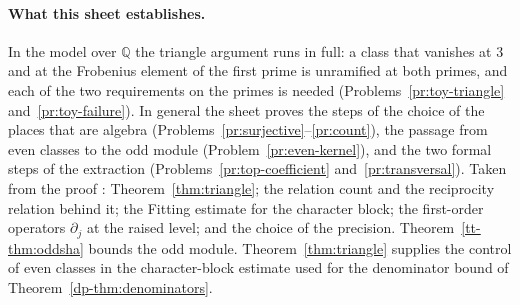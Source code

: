 \documentclass[reqno]{amsart}
\theoremstyle{definition}
\theoremstyle{plain}
\newcommand{\Q}{\mathbb{Q}}
\begin{document}
{\raggedright
\paragraph{What this sheet establishes.}  In the model over \(\Q\) the triangle argument runs in full: a class that vanishes at \(3\) and at the Frobenius element of the first prime is unramified at both primes, and each of the two requirements on the primes is needed (Problems~\ref{pr:toy-triangle} and~\ref{pr:toy-failure}).  In general the sheet proves the steps of the choice of the places that are algebra (Problems~\ref{pr:surjective}--\ref{pr:count}), the passage from even classes to the odd module (Problem~\ref{pr:even-kernel}), and the two formal steps of the extraction (Problems~\ref{pr:top-coefficient} and~\ref{pr:transversal}).  Taken from the proof \cite{GL}: Theorem~\ref{thm:triangle}; the relation count and the reciprocity relation behind it; the Fitting estimate for the character block; the first-order operators \(\partial_j\) at the raised level; and the choice of the precision.  Theorem~\ref{tt-thm:oddsha} bounds the odd module.  Theorem~\ref{thm:triangle} supplies the control of even classes in the character-block estimate used for the denominator bound of Theorem~\ref{dp-thm:denominators}.

}
\end{document}
